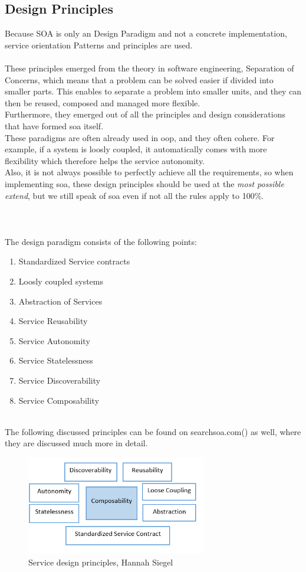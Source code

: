 \documentclass[12pt]{article}
\begin{document}
\subsection{Design Principles}
\label{sec:dp}
Because SOA is only an Design Paradigm and not a concrete implementation, service orientation Patterns and principles are used.\\\\
These principles emerged from the theory in software engineering, Separation of Concerns, which means that a problem can be solved easier if divided into smaller parts. This enables to separate a problem into smaller units, and they can then be reused, composed and managed more flexible.  \cite[page 86]{te}\\ Furthermore, they emerged out of all the principles and design considerations that have formed \gls{soa} itself.
\\
These paradigms are often already used in \gls{oop}, and they often cohere. For example, if a system is loosly coupled, it automatically comes with more flexibility which therefore helps the service autonomity. \\
Also, it is not always possible to perfectly achieve all the requirements, so when implementing \gls{soa}, these design principles should be used at the \textit{most possible extend}, but we still speak of \gls{soa} even if not all the rules apply to 100\%. \\ \\ \\ \\ \newpage
The design paradigm consists of the following points:
\begin{enumerate}
\item Standardized Service contracts
\item Loosly coupled systems
\item Abstraction of Services
\item Service Reusability
\item Service Autonomity
\item Service Statelessness
\item Service Discoverability
\item Service Composability
\end{enumerate}\cite[page 25]{grau}\\
The following discussed principles can be found on searchsoa.com(\cite{photos}) as well, where they are discussed much more in detail.
\begin{figure}[here!]
	\centering
	\includegraphics[width=0.7\textwidth]{images/servicepatterns2}
	\caption{Service design principles, Hannah Siegel}
	\label{fig:servicecontractcomponents}
	\end{figure} \FloatBarrier
\newpage
\end{document}
